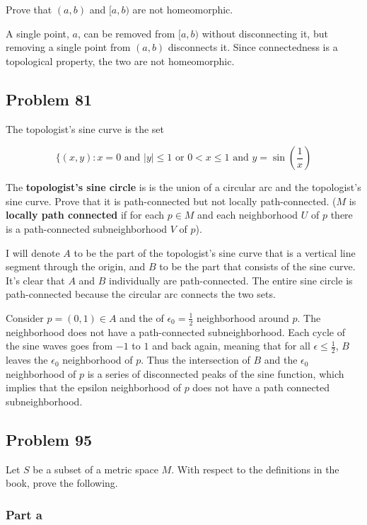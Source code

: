 \documentclass{article}
\begin{document}
Prove that $(a, b)$ and $[a, b)$ are not homeomorphic.

A single point, $a$, can be removed from $[a, b)$ without disconnecting it, but removing a single point from $(a, b)$ disconnects it. Since connectedness is a topological property, the two are not homeomorphic.

\subsection*{Problem 81}

The topologist's sine curve is the set

\[
\{(x, y): x = 0 \text{ and } |y| \leq 1 \text{ or } 0 < x \leq 1 \text{ and } y = \sin(\frac{1}{x})
\]

The \textbf{topologist's sine circle} is is the union of a circular arc and the topologist's sine curve. Prove that it is path-connected but not locally path-connected. ($M$ is \textbf{locally path connected} if for each $p \in M$ and each neighborhood $U$ of $p$ there is a path-connected subneighborhood $V$ of $p$).

I will denote $A$ to be the part of the topologist's sine curve that is a vertical line segment through the origin, and $B$ to be the part that consists of the sine curve. It's clear that $A$ and $B$ individually are path-connected. The entire sine circle is path-connected because the circular arc connects the two sets.

Consider $p = (0, 1) \in A$ and the of $\epsilon_0 = \frac{1}{2}$ neighborhood around $p$. The neighborhood does not have a path-connected subneighborhood. Each cycle of the sine waves goes from $-1$ to $1$ and back again, meaning that for all $\epsilon \leq \frac{1}{2}$, $B$ leaves the $\epsilon_0$ neighborhood of $p$. Thus the intersection of $B$ and the $\epsilon_0$ neighborhood of $p$ is a series of disconnected peaks of the sine function, which implies that the epsilon neighborhood of $p$ does not have a path connected subneighborhood.

\subsection*{Problem 95}

Let $S$ be a subset of a metric space $M$. With respect to the definitions in the book, prove the following.

\subsubsection*{Part a}
\end{document}
